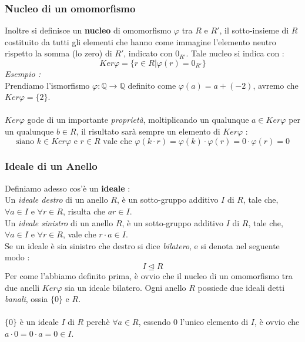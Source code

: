 \documentclass[12pt, letterpaper]{article}
\begin{document}
\subsubsection{Nucleo di un omomorfismo}
Inoltre si definisce un \textbf{nucleo} di omomorfismo \(\varphi\) tra \(R\) e \(R'\), il sotto-insieme 
di \(R\) costituito da tutti gli elementi che hanno come immagine l'elemento neutro rispetto la somma (lo zero) di \(R'\), indicato
con \(0_{R'}\). Tale nucleo si indica con :
\begin{equation}
    Ker\varphi = \{r\in R|\varphi(r)= 0_{R'}\}
\end{equation}
\textit{Esempio :}\\
Prendiamo l'ismorfismo \(\varphi : \mathbb{Q}\rightarrow \mathbb{Q}\) definito come \(\varphi(a)=a+(-2)\), avremo che 
\(Ker\varphi = \{2\}\).\\\hphantom{.}\\
\(Ker\varphi\) gode di un importante \textit{proprietà}, moltiplicando un qualunque \(a\in Ker\varphi\) per un 
qualunque \(b\in R\), il risultato sarà sempre un elemento di \(Ker\varphi\) : 
\begin{equation}
    \text{siano } k\in Ker\varphi\text{ e } r\in R \text{ vale che }\varphi(k\cdot r)=\varphi(k)\cdot\varphi(r)=0\cdot \varphi(r)=0
\end{equation}\subsubsection{Ideale di un Anello}
Definiamo adesso cos'è un \textbf{ideale} :\\
Un \textit{ideale destro} di un anello \(R\), è un sotto-gruppo additivo \(I\) di \(R\),  tale che, \(\forall a\in I\) e 
\(\forall r \in R\), risulta che \(ar \in I\). \\Un \textit{ideale sinistro} di un anello \(R\), è un sotto-gruppo additivo \(I\) di \(R\),  tale che, \(\forall a\in I\) e 
\(\forall r \in R\), vale che \(r\cdot a \in I\). \\
Se un ideale è sia sinistro che destro si dice \textit{bilatero}, e si denota nel seguente modo :\begin{equation}
    I \trianglelefteq  R
\end{equation}
Per come l'abbiamo definito prima, è ovvio che il nucleo di un omomorfismo tra due anelli \(Ker\varphi\) sia un ideale bilatero.
Ogni anello \(R\) possiede due ideali detti \textit{banali}, ossia \(\{0\}\) e \(R\).\\ \hphantom{.}\\
\(\{0\}\) è un ideale \(I\) di \(R\) perchè \(\forall a\in R\), essendo 0 l'unico elemento di \(I\), è ovvio che \(a\cdot 0 = 0\cdot a = 0 \in I\).
\end{document}
